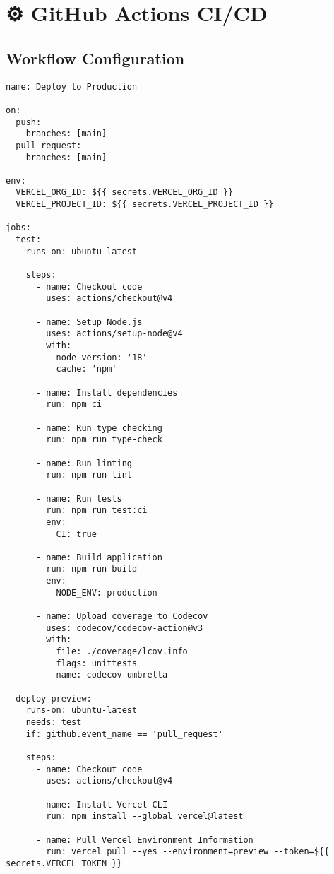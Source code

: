 \documentclass[11pt,a4paper]{article}
\begin{document}
\section{⚙️ GitHub Actions CI/CD}

\subsection{Workflow Configuration}

\begin{lstlisting}[style=bash, caption=.github/workflows/deploy.yml]
name: Deploy to Production

on:
  push:
    branches: [main]
  pull_request:
    branches: [main]

env:
  VERCEL_ORG_ID: ${{ secrets.VERCEL_ORG_ID }}
  VERCEL_PROJECT_ID: ${{ secrets.VERCEL_PROJECT_ID }}

jobs:
  test:
    runs-on: ubuntu-latest
    
    steps:
      - name: Checkout code
        uses: actions/checkout@v4
        
      - name: Setup Node.js
        uses: actions/setup-node@v4
        with:
          node-version: '18'
          cache: 'npm'
          
      - name: Install dependencies
        run: npm ci
        
      - name: Run type checking
        run: npm run type-check
        
      - name: Run linting
        run: npm run lint
        
      - name: Run tests
        run: npm run test:ci
        env:
          CI: true
          
      - name: Build application
        run: npm run build
        env:
          NODE_ENV: production
          
      - name: Upload coverage to Codecov
        uses: codecov/codecov-action@v3
        with:
          file: ./coverage/lcov.info
          flags: unittests
          name: codecov-umbrella
          
  deploy-preview:
    runs-on: ubuntu-latest
    needs: test
    if: github.event_name == 'pull_request'
    
    steps:
      - name: Checkout code
        uses: actions/checkout@v4
        
      - name: Install Vercel CLI
        run: npm install --global vercel@latest
        
      - name: Pull Vercel Environment Information
        run: vercel pull --yes --environment=preview --token=${{ secrets.VERCEL_TOKEN }}
        

\end{lstlisting}
\end{document}
